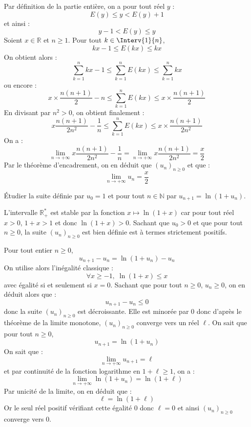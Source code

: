 \documentclass[a4paper,10pt]{report}
\begin{document}
\corr Par définition de la partie entière, on a pour tout réel $y$ :
$$ E(y) \leq y < E(y) + 1 $$
et ainsi :
$$ y-1 < E(y) \leq y$$
Soient $x \in \mathbb{R}$ et $n \geq 1$. Pour tout $k \in \Interv{1}{n}$,
$$ kx - 1 \leq E(kx) \leq kx $$
On obtient alors :
$$ \sum_{k=1}^n kx-1 \leq \sum_{k=1}^n E(kx) \leq \sum_{k=1}^n kx $$
ou encore :
$$ x \times \dfrac{n(n+1)}{2} - n \leq \sum_{k=1}^n E(kx) \leq x \times \dfrac{n(n+1)}{2}$$
En divisant par $n^2 >0$, on obtient finalement :
$$ x \dfrac{n(n+1)}{2n^2} - \dfrac{1}{n} \leq \sum_{k=1}^n E(kx) \leq x \times \dfrac{n(n+1)}{2n^2}$$
On a :
$$ \lim_{n \rightarrow + \infty} x \dfrac{n(n+1)}{2n^2} - \dfrac{1}{n}  = \lim_{n \rightarrow + \infty} x \dfrac{n(n+1)}{2n^2} = \dfrac{x}{2}$$
Par le théorème d'encadrement, on en déduit que $(u_n)_{n \geq 0}$ et que :
$$ \lim_{n \rightarrow + \infty} u_n = \dfrac{x}{2}$$

\medskip

\begin{Exa} Étudier la suite définie par $u_0=1$ et pour tout $n \in \mathbb{N}$ par $u_{n+1}=\ln(1+u_n)$.
\end{Exa} 

\corr L'intervalle $\mathbb{R}_+^{*}$ est stable par la fonction $x \mapsto \ln(1+x)$ car pour tout réel $x>0$, $1+x>1$ et donc $\ln(1+x)>0$. Sachant que $u_0>0$ et que pour tout $n \geq 0$, la suite $(u_n)_{n \geq 0}$ est bien définie est à termes strictement positifs.

\medskip

\noindent Pour tout entier $n \geq 0$,
$$u_{n+1}-u_n = \ln(1+u_n)-u_n $$
On utilise alors l'inégalité classique :
$$ \forall x \geq -1, \; \ln(1+x) \leq x$$
avec égalité si et seulement si $x=0$. Sachant que pour tout $n \geq 0$, $u_n \geq 0$, on en déduit alors que :
$$ u_{n+1}-u_n \leq 0$$
donc la suite $(u_n)_{n \geq 0}$ est décroissante. Elle est minorée par $0$ donc d'après le théorème de la limite monotone, $(u_n)_{n \geq 0}$ converge vers un réel $\ell$. On sait que pour tout $n \geq 0$,
$$ u_{n+1} = \ln(1+u_n)$$
On sait que :
$$ \lim_{n \rightarrow + \infty} u_{n+1} = \ell$$
et par continuité de la fonction logarithme en $1+ \ell \geq 1$, on a :
$$ \lim_{n \rightarrow + \infty} \ln(1+u_n) = \ln(1+ \ell)$$
Par unicité de la limite, on en déduit que :
$$ \ell = \ln(1+\ell)$$
Or le seul réel positif vérifiant cette égalité $0$ donc $\ell=0$ et ainsi $(u_n)_{n \geq 0}$ converge vers $0$.

%
\end{document}
